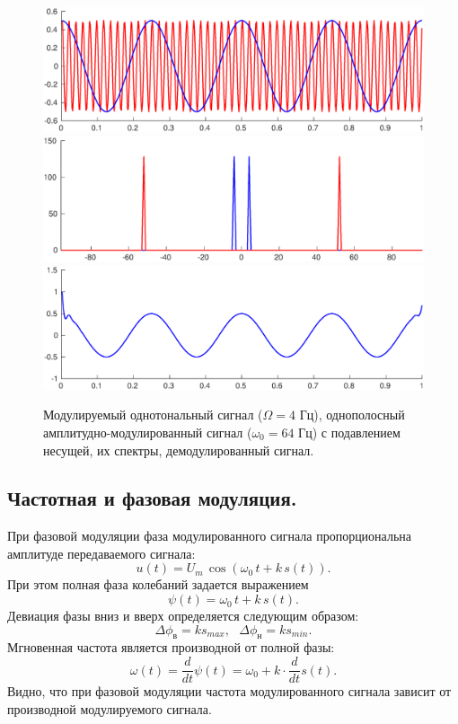 \documentclass[a4paper,14pt]{extarticle}
\begin{document}
\begin{figure}[p]
\centering
\includegraphics[width=1\textwidth]{ssbmod.eps}
\includegraphics[width=1\textwidth]{ssbmod_s.eps}
\includegraphics[width=1\textwidth]{ssbdemod_s.eps}
\captionsetup{justification=centering,margin=0.5cm}
\caption{Модулируемый однотональный сигнал ($\Omega = 4$ Гц), однополосный амплитудно-модулированный сигнал ($\omega_0 = 64$ Гц) с подавлением несущей, их спектры, демодулированный сигнал.}
\label{am4}
\end{figure}

\subsection{Частотная и фазовая модуляция.}

При фазовой модуляции фаза модулированного сигнала пропорциональна амплитуде передаваемого сигнала:
\begin{equation*}
u(t) = U_m \, \cos(\omega_0 \, t + k \, s(t)).
\end{equation*}
При этом полная фаза колебаний задается выражением
\begin{equation*}
\psi(t) = \omega_0 \, t + k \, s(t).
\end{equation*}
Девиация фазы вниз и вверх определяется следующим образом:
\begin{equation*}
\Delta \phi_\text{в} = k s_{max}, ~ ~ ~ \Delta \phi_\text{н} = k s_{min}.
\end{equation*} 
Мгновенная частота является производной от полной фазы:
\begin{equation*}
\omega(t) = \frac{d}{dt} \psi(t) =  \omega_0 + k \cdot \frac{d}{dt} s(t).
\end{equation*}
Видно, что при фазовой модуляции частота модулированного сигнала зависит от производной модулируемого сигнала. 
\end{document}
